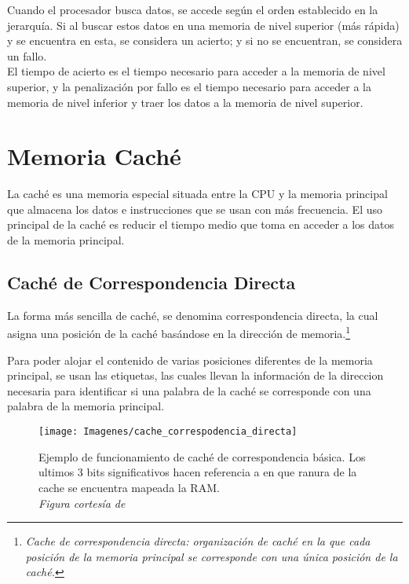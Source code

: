 \documentclass[12pt]{article}
\begin{document}
	Cuando el procesador busca datos, se accede según el orden establecido en la jerarquía. Si al buscar estos datos en una memoria de nivel superior (más rápida) y se encuentra en esta, se considera un acierto; y si no se encuentran, se considera un fallo.\\

	El tiempo de acierto es el tiempo necesario para acceder a la memoria de nivel superior, y la penalización por fallo es el tiempo necesario para acceder a la memoria de nivel inferior y traer los datos a la memoria de nivel superior.

	\section{Memoria Caché} \cite{patterson-2011}
	La caché es una memoria especial situada entre la CPU y la memoria principal que almacena los datos e instrucciones que se usan con más frecuencia. El uso principal de la caché es reducir el tiempo medio que toma en acceder a los datos de la memoria principal. \cite{geeksforgeeks-2023} \\

	\subsection{Caché de Correspondencia Directa}
	La forma más sencilla de caché, se denomina correspondencia directa, la cual asigna una posición de la caché basándose en la dirección de memoria.\footnote{\textit{Cache de correspondencia directa: organización de caché en la que cada posición de la memoria principal se corresponde con una única posición de la caché.}}

	Para poder alojar el contenido de varias posiciones diferentes de la memoria principal, se usan las etiquetas, las cuales llevan la información de la direccion necesaria para identificar si una palabra de la caché se corresponde con una palabra de la memoria principal.

	\begin{figure}[H]
		\centering
		\texttt{[image: Imagenes/cache\_correspodencia\_directa]}
		\caption{Ejemplo de funcionamiento de caché de correspondencia básica. Los ultimos 3 bits significativos hacen referencia a en que ranura de la cache se encuentra mapeada la RAM.\\
			\textit{Figura cortesía de \cite{patterson-2011}}}
		\label{fig:cachecorrespodenciadirecta}
	\end{figure}
\end{document}
